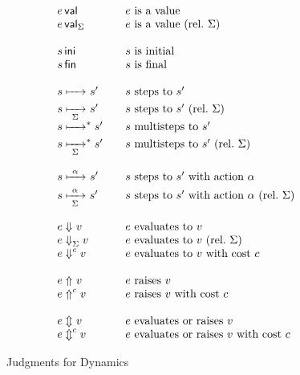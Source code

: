 \documentclass[11pt]{article}
\begin{document}
\begin{figure}[tp]
    \begin{displaymath}
        \begin{array}{l@{\qquad}l}
            \isVal{e}            &  e\ \text{is a value} \\
            \isVal[\Sigma]{e}    & e\ \text{is a value}\ (\text{rel.}\ \Sigma) \\\\
            \isIni{s}            & s\ \text{is initial} \\
            \isFin{s}            & s\ \text{is final} \\\\
            s\stepsTo s'         & s\ \text{steps to}\ s' \\
            s\stepsTo[\Sigma] s' & s\ \text{steps to}\ s'\ (\text{rel.}\ \Sigma)\\
            s\stepsTo(\ast) s' & s\ \text{multisteps to}\ s' \\
            s\stepsTo[\Sigma](\ast) s' & s\ \text{multisteps to}\ s'\ (\text{rel.}\ \Sigma) \\\\
            s\stepsTo<\alpha> s' & s\ \text{steps to}\ s'\ \text{with action}\ \alpha \\
            s\stepsTo[\Sigma]<\alpha> s' & s\ \text{steps to}\ s'\ \text{with action}\ \alpha\ (\text{rel.}\ \Sigma) \\\\
            e\evalsTo v          & e\ \text{evaluates to}\ v \\
            e\evalsTo[\Sigma] v  & e\ \text{evaluates to}\ v\ (\text{rel.}\ \Sigma) \\
            e\evalsTo(c) v       & e\ \text{evaluates to}\ v\ \text{with cost}\ c \\\\
            e\raises v           & e\ \text{raises}\ v \\
            e\raises(c) v        & e\ \text{raises}\ v\ \text{with cost}\ c \\\\
            e\evalsorraises v    & e\ \text{evaluates or raises}\ v \\
            e\evalsorraises(c) v    & e\ \text{evaluates or raises}\ v\ \text{with cost}\ c
        \end{array}
    \end{displaymath}

    \caption{Judgments for Dynamics}
    \label{fig:dynamics}
\end{figure}
\end{document}
